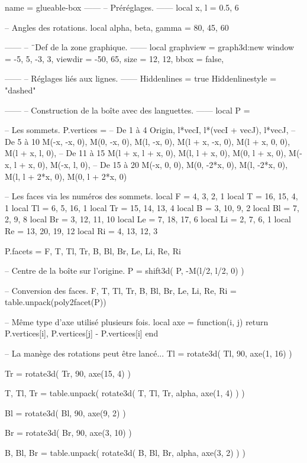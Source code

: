 \documentclass[border = 3pt]{standalone}
\begin{document}
\begin{luadraw*}{name = glueable-box}
------
-- Préréglages.
------
local x, l = 0.5, 6

-- Angles des rotations.
local alpha, beta, gamma = 80, 45, 60

------
-- ¨Def de la zone graphique.
------
local graphview = graph3d:new{
  window  = {-5, 5, -3, 3},
  viewdir = {-50, 65},
  size    = {12, 12},
  bbox    = false,
}

------
-- Réglages liés aux lignes.
------
Hiddenlines     = true
Hiddenlinestyle = "dashed"

------
-- Construction de la boîte avec des languettes.
------
local P = {}

-- Les sommets.
P.vertices = {
-- De 1 à 4
  Origin,
  l*vecI,
  l*(vecI + vecJ),
  l*vecJ,
-- De 5 à 10
  M(-x, -x, 0),
  M(0, -x, 0),
  M(l, -x, 0),
  M(l + x, -x, 0),
  M(l + x, 0, 0),
  M(l + x, l, 0),
-- De 11 à 15
  M(l + x, l + x, 0),
  M(l, l + x, 0),
  M(0, l + x, 0),
  M(-x, l + x, 0),
  M(-x, l, 0),
-- De 15 à 20
  M(-x, 0, 0),
  M(0, -2*x, 0),
  M(l, -2*x, 0),
  M(l, l + 2*x, 0),
  M(0, l + 2*x, 0)
}

-- Les faces via les numéros des sommets.
local F  = {4, 3, 2, 1}
local T  = {16, 15, 4, 1}
local Tl = {6, 5, 16, 1}
local Tr = {15, 14, 13, 4}
local B  = {3, 10, 9, 2}
local Bl = {7, 2, 9, 8}
local Br = {3, 12, 11, 10}
local Le = {7, 18, 17, 6}
local Li = {2, 7, 6, 1}
local Re = {13, 20, 19, 12}
local Ri = {4, 13, 12, 3}

P.facets = {
  F,
  T, Tl, Tr,
  B, Bl, Br,
  Le, Li,
  Re, Ri
}

-- Centre de la boîte sur l'origine.
P = shift3d(
  P,
  -M(l/2, l/2, 0)
)

-- Conversion des faces.
F, T, Tl, Tr, B, Bl, Br, Le, Li, Re, Ri = table.unpack(poly2facet(P))

-- Même type d'axe utilisé plusieurs fois.
local axe = function(i, j)
  return {
    P.vertices[i],
    P.vertices[j] - P.vertices[i]
  }
end

-- La manège des rotations peut être lancé...
Tl = rotate3d(
  Tl,
  90, axe(1, 16)
)

Tr = rotate3d(
  Tr,
  90, axe(15, 4)
)

T, Tl, Tr = table.unpack(
  rotate3d(
    {T, Tl, Tr},
    alpha, axe(1, 4)
  )
)

Bl = rotate3d(
  Bl,
  90, axe(9, 2)
)

Br = rotate3d(
  Br,
  90, axe(3, 10)
)

B, Bl, Br = table.unpack(
  rotate3d(
    {B, Bl, Br},
    alpha, axe(3, 2)
  )
)


\end{luadraw*}
\end{document}
